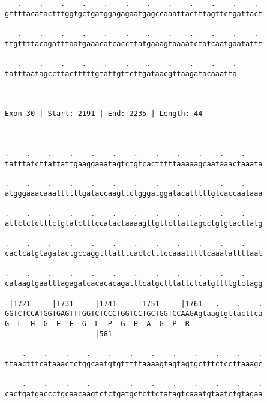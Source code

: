 \documentclass{article}
\begin{document}
\begin{Verbatim}
   .    .    .    .    .    .    .    .    .    .    .    . 
gttttacatactttggtgctgatggagagaatgagccaaattactttagttctgattact
                                                            
   .    .    .    .    .    .    .    .    .    .    .    . 
ttgttttacagatttaatgaaacatcaccttatgaaagtaaaatctatcaatgaatattt
                                                            
   .    .    .    .    .    .    .    .    .    .    .
tatttaatagccttactttttgtattgttcttgataacgttaagatacaaatta
                                                      
                                                      
 
Exon 30 | Start: 2191 | End: 2235 | Length: 44



.    .    .    .    .    .    .    .    .    .    .    .    
tatttatcttattattgaaggaaatagtctgtcactttttaaaaagcaataaactaaata
                                                            
.    .    .    .    .    .    .    .    .    .    .    .    
atgggaaacaaattttttgataccaagttctgggatggatacatttttgtcaccaataaa
                                                            
.    .    .    .    .    .    .    .    .    .    .    .    
attctctctttctgtatctttccatactaaaagttgttcttattagcctgtgtacttatg
                                                            
.    .    .    .    .    .    .    .    .    .    .    .    
cactcatgtagatactgccaggtttatttcactctttccaaatttttcaaatattttaat
                                                            
.    .    .    .    .    .    .    .    .    .    .    .    
cataagtgaatttagagatcacacacagatttcatgctttattctcatgttttgtctagg
                                                            
 |1721     |1731     |1741     |1751     |1761   .    .    .
GGTCTCCATGGTGAGTTTGGTCTCCCTGGTCCTGCTGGTCCAAGAgtaagtgttacttca
G  L  H  G  E  F  G  L  P  G  P  A  G  P  R                 
                     |581                                   
  
    .    .    .    .    .    .    .    .    .    .    .    .
ttaactttcataaactctggcaatgtgtttttaaaagtagtagtgctttctccttaaagc
                                                            
    .    .    .    .    .    .    .    .    .    .    .    .
cactgatgaccctgcaacaagtctctgatgctcttctatagtcaaatgtaatctgtagaa
                                                            

\end{Verbatim}
\end{document}
